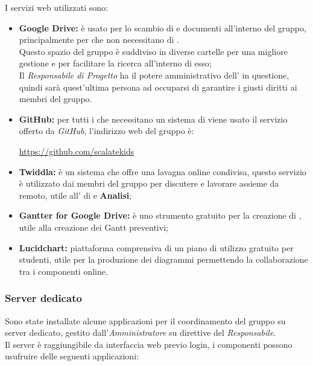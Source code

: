 \documentclass{scalatekids-article}
\begin{document}
\label{sec:ServiziWeb}
I servizi web utilizzati sono:
\begin{itemize}
\item\textbf{Google Drive:} è usato per lo scambio di  e documenti all'interno del gruppo, principalmente per  che non necessitano di .\\
  Questo spazio del gruppo è suddiviso in diverse cartelle per una migliore gestione e per facilitare la ricerca all'interno di esso;\\
  Il \textit{Responsabile di Progetto} ha il potere amministrativo dell' in questione, quindi sarà quest'ultima persona ad occuparsi di garantire i giusti diritti ai membri del gruppo.
\item\textbf{GitHub:} per tutti i  che necessitano un sistema di  viene usato il servizio offerto da \textit{GitHub}, l'indirizzo web del gruppo è:\\
  \begin{center}
    \url{https://github.com/scalatekids}
  \end{center}
\item\textbf{Twiddla:} è un sistema che offre una lavagna online condivisa, questo servizio è utilizzato dai membri del gruppo per discutere e lavorare assieme da remoto, utile all' di  e \textbf{Analisi};
\item\textbf{Gantter for Google Drive:} è uno strumento gratuito per la creazione di , utile alla creazione dei Gantt preventivi;
\item\textbf{Lucidchart:} piattaforma comprensiva di un piano di utilizzo
  gratuito per studenti, utile per la produzione dei diagrammi
   permettendo la collaborazione tra i componenti online.
\end{itemize}

\subsubsection{Server dedicato}

\label{sec:server}
Sono state installate alcune applicazioni per il coordinamento del gruppo su
server dedicato, gestito dall'\textit{Amministratore} su direttive del
\textit{Responsabile}.\\ Il server è raggiungibile da interfaccia web previo
login, i componenti possono usufruire delle seguenti applicazioni:
\end{document}

